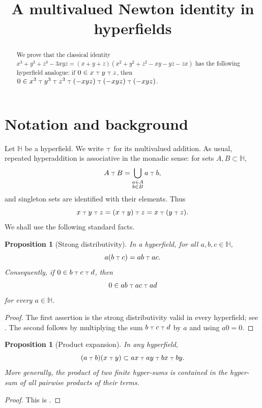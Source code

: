 \documentclass[11pt]{article}
\title{A multivalued Newton identity in hyperfields}
\author{}
\date{}
\newtheorem{proposition}[theorem]{Proposition}
\newcommand{\boxplus}{\mathbin{\lower 0.86108pt\hbox{$\scriptstyle\top$}}}
\newcommand{\hypfield}{\mathbb{H}}
\begin{document}
\maketitle

\begin{abstract}
We prove that the classical identity
\(x^3+y^3+z^3-3xyz=(x+y+z)(x^2+y^2+z^2-xy-yz-zx)\)
has the following hyperfield analogue: if
\(0\in x\boxplus y\boxplus z\), then
\(0\in x^3\boxplus y^3\boxplus z^3\boxplus (-xyz)\boxplus (-xyz)\boxplus (-xyz)\).
\end{abstract}

\section{Notation and background}
Let \(\hypfield\) be a hyperfield.  We write \(\boxplus\) for its multivalued
addition.  As usual, repeated hyperaddition is associative in the monadic
sense: for sets \(A,B\subset \hypfield\),
\[
A\boxplus B=\bigcup_{\substack{a\in A\\ b\in B}} a\boxplus b,
\]
and singleton sets are identified with their elements.  Thus
\[
x\boxplus y\boxplus z=(x\boxplus y)\boxplus z=x\boxplus(y\boxplus z).
\]
We shall use the following standard facts.

\begin{proposition}[Strong distributivity]\label{prop:dist}
In a hyperfield, for all \(a,b,c\in\hypfield\),
\[
a(b\boxplus c)=ab\boxplus ac.
\]
Consequently, if \(0\in b\boxplus c\boxplus d\), then
\[
0\in ab\boxplus ac\boxplus ad
\]
for every \(a\in\hypfield\).
\end{proposition}

\begin{proof}
The first assertion is the strong distributivity valid in every hyperfield;
see \cite[Theorem 4.A]{viro}.  The second follows by multiplying the
sum \(b\boxplus c\boxplus d\) by \(a\) and using \(a0=0\).
\end{proof}

\begin{proposition}[Product expansion]\label{prop:product}
In any hyperfield,
\[
(a\boxplus b)(x\boxplus y)
\subset
ax\boxplus ay\boxplus bx\boxplus by .
\]
More generally, the product of two finite hyper-sums is contained in the
hyper-sum of all pairwise products of their terms.
\end{proposition}

\begin{proof}
This is \cite[Theorem 4.B]{viro}.
\end{proof}
\end{document}
